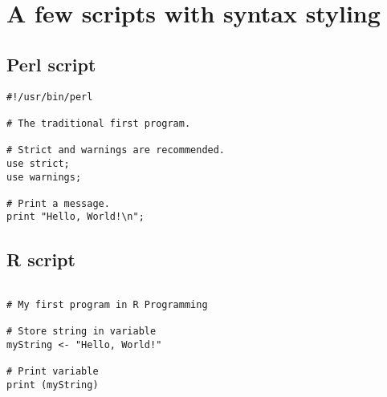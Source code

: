 \chapter{A few scripts with syntax styling}
\label{append:two}

\section{Perl script}

\lstset{language=Perl}
\begin{lstlisting}
#!/usr/bin/perl

# The traditional first program.

# Strict and warnings are recommended.
use strict;
use warnings;

# Print a message.
print "Hello, World!\n";
\end{lstlisting}

\bigskip

\section{R script}

\lstset{language=R}
\begin{lstlisting}

# My first program in R Programming

# Store string in variable
myString <- "Hello, World!"

# Print variable
print (myString)

\end{lstlisting}